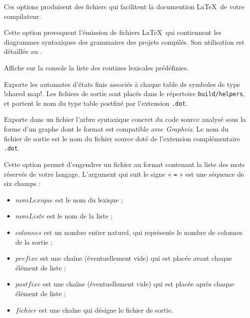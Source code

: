 {Ces options produisent des fichiers qui facilitent la documention \LaTeX~de votre compilateur.

 Cette option provoquent l'émission de fichiers \LaTeX~qui contiennent les diagrammes syntaxiques des grammaires des projets compilés. Son utilisation est détaillée au . %





 Affiche sur la console la liste des routines lexicales prédéfinies.




 Exporte les automates d'états finis associés à chaque table de symboles de type \ggst!shared map!. Les fichiers de sortie sont placés dans le répertoire \texttt{build/helpers}, et portent le nom du type table postfixé par l'extension \texttt{.dot}.





 Exporte dans un fichier l'arbre syntaxique concret du code source analysé sous la forme d'un graphe dont le format est compatible avec \emph{Graphviz}. Le nom du fichier de sortie est le nom du fichier source doté de l'extension complémentaire \texttt{.dot}.


 Cette option permet d'engendrer un fichier au format contenant la liste des mots réservés de votre langage. L'argument qui suit le signe « \texttt{=} » est une séquence de six champs :
\begin{itemize}
  \item $nomLexique$ est le nom du lexique ;
  \item $nomListe$ est le nom de la liste ;
  \item $colonnes$ est un nombre entier naturel, qui représente le nombre de colonnes de la sortie ;
  \item $prefixe$ est une chaîne (éventuellement vide) qui est placée avant chaque élément de liste ;
  \item $postfixe$ est une chaîne (éventuellement vide) qui est placée après chaque élément de liste ;
  \item $fichier$ est une chaîne qui désigne le fichier de sortie.
\end{itemize}

}
